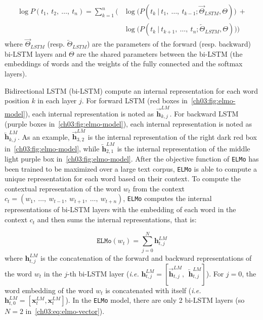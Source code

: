     \begin{equation}
      \begin{split}
      \log P(t_1,~t_2,~\dots,~t_n) = \sum_{k=1}^n
        \Big(
      & \log \big(P(t_k~|~t_1,~\dots,~t_{k-1};
             \overrightarrow{\Theta}_{LSTM},\Theta)\big)~+\\
      & \log \big(P(t_k~|~t_{k+1},~\dots,~t_{n};
             \overleftarrow{\Theta}_{LSTM},\Theta)\big)
        \Big)
      \end{split}
    \end{equation}
    where $\overrightarrow{\Theta}_{LSTM}$ (resp.
    $\overleftarrow{\Theta}_{LSTM}$) are the parameters of the forward (resp.
    backward) bi-LSTM layers and $\Theta$ are the shared parameters between the
    bi-LSTM (the embeddings of words and the weights of the fully connected and
    the softmax layers). \medskip

    Bidirectional LSTM (bi-LSTM) compute an internal representation for each
    word position $k$ in each layer $j$. For forward LSTM (red boxes
    in~\autoref{ch03:fig:elmo-model}), each internal representation is noted as
    $\overrightarrow{\mathbf{h}}_{k, j}^{LM}$. For backward LSTM (purple boxes
    in~\autoref{ch03:fig:elmo-model}), each internal representation is noted as
    $\overleftarrow{\mathbf{h}}_{k, j}^{LM}$. As an example,
    $\overrightarrow{\mathbf{h}}_{3, 2}^{LM}$ is the internal representation of
    the right dark red box in~\autoref{ch03:fig:elmo-model}, while
    $\overleftarrow{\mathbf{h}}_{2, 1}^{LM}$ is the internal representation of
    the middle light purple box in~\autoref{ch03:fig:elmo-model}. After the
    objective function of \texttt{ELMo} has been trained to be maximized over a
    large text corpus, \texttt{ELMo} is able to compute a unique representation
    for each word based on their context. To compute the contextual
    representation of the word $w_t$ from the context $c_t = (w_1,
    ~\dots,~w_{t-1},~w_{t+1},~\dots,~w_{t+n})$, \texttt{ELMo} computes the
    internal representations of bi-LSTM layers with the embedding of each word
    in the context $c_t$ and then sums the internal representations, that is:

    \begin{equation}
      \label{ch03:eq:elmo-vector}
      \mathtt{ELMo}(w_t) = \sum_{j = 0}^N \mathbf{h}_{t, j}^{LM}
    \end{equation}
    where $\mathbf{h}_{t, j}^{LM}$ is the concatenation of the forward and
    backward representations of the word $w_t$ in the $j$-th bi-LSTM layer
    (\textit{i.e.} $\mathbf{h}_{t, j}^{LM} = [\overrightarrow{\mathbf{h}}_{t,
    j}^{LM},~~ \overleftarrow{\mathbf{h}}_{t, j}^{LM}]$). For $j = 0$, the word
    embedding of the word $w_t$ is concatenated with itself (\textit{i.e.}
    $\mathbf{h}_{t, 0}^{LM} = [\mathbf{x}_t^{LM}, \mathbf{x}_t^{LM}]$). In the
    \texttt{ELMo} model, there are only 2 bi-LSTM layers (so $N = 2$
    in~\autoref{ch03:eq:elmo-vector}). \medskip

